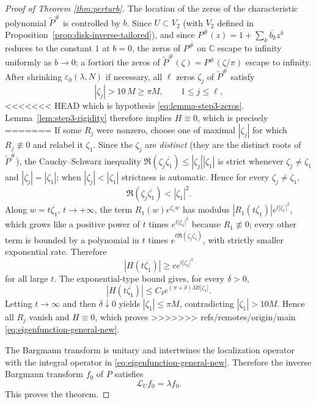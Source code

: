 \documentclass[a4paper,11pt,reqno]{amsart}
\numberwithin{equation}{section}
\theoremstyle{plain} %
\theoremstyle{definition} %
\theoremstyle{remark}
\newcommand{\C}{\mathbb{C}}
\begin{document}
\begin{proof}[Proof of Theorem \ref{thm:perturb}]
The location of the zeros of the characteristic polynomial \(\widetilde P^\#\)
is controlled by \(b\). Since \(U\subset V_2\) (with \(V_2\) defined in
Proposition~\ref{prop:disk-inverse-tailored}), and since
\(P^\#(z)=1+\sum_k\overline{b_k}z^k\) reduces to the constant \(1\) at
\(b=0\), the zeros of \(P^\#\) on \(\C\) escape to infinity uniformly as
\(b\to0\); a fortiori the zeros of \(\widetilde P^\#(\zeta)=P^\#(\zeta/\pi)\)
escape to infinity. After shrinking \(\varepsilon_0(\lambda,N)\) if
necessary, all \(\ell\) zeros \(\zeta_j\) of \(\widetilde P^\#\) satisfy
\[
|\zeta_j|>10\,M\ge\pi M,
\qquad 1\le j\le\ell,
\]
<<<<<<< HEAD
which is hypothesis \eqref{eq:lemma-step3-zeros}. Lemma~\ref{lem:step3-rigidity}
therefore implies $H\equiv 0$, which is precisely
=======
If some \(R_j\) were nonzero, choose one of maximal \(|\zeta_j|\) for which
\(R_j\not\equiv0\) and relabel it \(\zeta_1\). Since the \(\zeta_j\) are
\emph{distinct} (they are the distinct roots of \(\widetilde P^\#\)),
the Cauchy--Schwarz inequality
\(\Re(\zeta_j\overline{\zeta_1})\le|\zeta_j||\zeta_1|\) is strict whenever
\(\zeta_j\ne\zeta_1\) and \(|\zeta_j|=|\zeta_1|\); when \(|\zeta_j|<|\zeta_1|\)
strictness is automatic. Hence for every \(\zeta_j\ne\zeta_1\),
\[
\Re(\zeta_j\overline{\zeta_1})<|\zeta_1|^2 .
\]
Along \(w=t\overline{\zeta_1}\), \(t\to+\infty\), the term
\(R_1(w)e^{\zeta_1w}\) has modulus \(|R_1(t\overline{\zeta_1})|e^{t|\zeta_1|^2}\),
which grows like a positive power of \(t\) times \(e^{t|\zeta_1|^2}\)
because \(R_1\not\equiv0\); every other term is bounded by a polynomial
in \(t\) times \(e^{t\Re(\zeta_j\overline{\zeta_1})}\), with strictly smaller
exponential rate. Therefore
\[
|H(t\overline{\zeta_1})|\ge c e^{t|\zeta_1|^2}
\]
for all large \(t\). The exponential-type bound gives, for every
\(\delta>0\),
\[
|H(t\overline{\zeta_1})|
\le C_\delta e^{(\pi+\delta)Mt|\zeta_1|}.
\]
Letting \(t\to\infty\) and then \(\delta\downarrow0\) yields
\(|\zeta_1|\le \pi M\), contradicting \(|\zeta_1|>10M\). Hence all
\(R_j\) vanish and \(H\equiv0\), which proves
>>>>>>> refs/remotes/origin/main
\eqref{eq:eigenfunction-general-new}.

The Bargmann transform is unitary and intertwines the localization operator
with the integral operator in \eqref{eq:eigenfunction-general-new}. Therefore
the inverse Bargmann transform \(f_0\) of \(P\) satisfies
\[
\mathcal L_U f_0=\lambda f_0 .
\]
This proves the theorem.
\end{proof}


\end{document}
